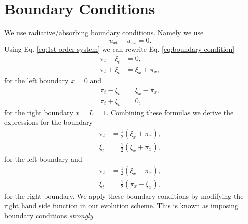 \documentclass[reprint, aps, prd, nofootinbib, superscriptaddress, floatfix]{revtex4-2}  %
\begin{document}
\section{Boundary Conditions}
We use radiative/absorbing boundary conditions. Namely we use
\begin{equation}
  \label{eq:boundary-condition}
  u_{xt} - u_{xx} = 0.
\end{equation}
Using Eq. \ref{eq:1st-order-system} we can rewrite Eq. \ref{eq:boundary-condition}
\begin{align}
  \label{eq:bc-left}
  \pi_t - \xi_t &= 0, \\
  \pi_t + \xi_t &= \xi_x + \pi_x,
\end{align}
for the left boundary $x=0$ and
\begin{align}
  \label{eq:bc-right}
  \pi_t - \xi_t &= \xi_x - \pi_x, \\
  \pi_t + \xi_t &= 0,
\end{align}
for the right boundary $x=L=1$. Combining these formulas we derive the expressions for the boundary
\begin{equation}
  \label{eq:rhs-bc-left}
  \begin{split}
    \pi_t &= \frac{1}{2} (\xi_x + \pi_x), \\
    \xi_t &= \frac{1}{2} (\xi_x + \pi_x),
  \end{split}
\end{equation}
for the left boundary and
\begin{equation}
  \label{eq:rhs-bc-right}
  \begin{split}
    \pi_t &= \frac{1}{2} (\xi_x - \pi_x), \\
    \xi_t &= \frac{1}{2} (\pi_x - \xi_x),
  \end{split}
\end{equation}
for the right boundary. We apply these boundary conditions by modifying the right hand side function in our evolution scheme. This is known as imposing boundary conditions \textit{strongly}.
\end{document}
